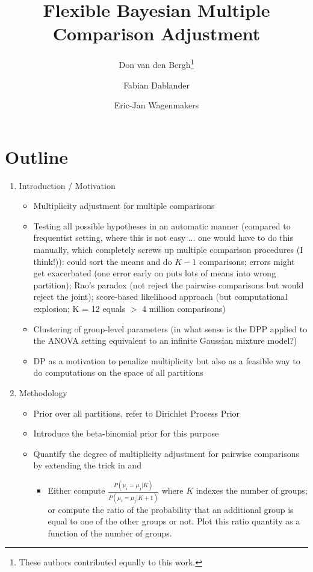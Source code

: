 \documentclass[11pt,a4paper]{article}
\date{}
\title{Flexible Bayesian Multiple Comparison Adjustment}
\author[1]{Don van den Bergh\thanks{These authors contributed equally to this work.}}
\author[1]{Fabian Dablander\samethanks[1]}
\author[1]{Eric-Jan Wagenmakers}
\affil[1]{Department of Psychological Methods, University of Amsterdam}
\theoremstyle{definition} %
\theoremstyle{case}
\begin{document}
\maketitle

\section*{Outline}
\begin{enumerate}
    \item Introduction / Motivation
    \begin{itemize}
        \item Multiplicity adjustment for multiple comparisons
        \item Testing all possible hypotheses in an automatic manner (compared to frequentist setting, where this is not easy ... one would have to do this manually, which completely screws up multiple comparison procedures (I think!)): could sort the means and do $K - 1$ comparisons; errors might get exacerbated (one error early on puts lots of means into wrong partition); Rao's paradox (not reject the pairwise comparisons but would reject the joint); score-based likelihood approach (but computational explosion; K = 12 equals $>$ 4 million comparisons)
        \item Clustering of group-level parameters (in what sense is the DPP applied to the ANOVA setting equivalent to an infinite Gaussian mixture model?)
        \item DP as a motivation to penalize multiplicity but also as a feasible way to do computations on the space of all partitions
    \end{itemize}
    \item Methodology
    \begin{itemize}
        \item Prior over all partitions, refer to Dirichlet Process Prior \parencite{gopalan1998bayesian}
        \item Introduce the beta-binomial prior for this purpose \parencite{scott2006exploration}
        \item Quantify the degree of multiplicity adjustment for pairwise comparisons by extending the trick in \textcite{scott2010bayes} and \textcite{li2016role}
        \begin{itemize}
            \item Either compute $\frac{P(\mu_i = \mu_j | K)}{P(\mu_i = \mu_j | K + 1)}$ where $K$ indexes the number of groups; or compute the ratio of the probability that an additional group is equal to one of the other groups or not. Plot this ratio quantity as a function of the number of groups.

\end{itemize}
\end{itemize}
\end{enumerate}
\end{document}
